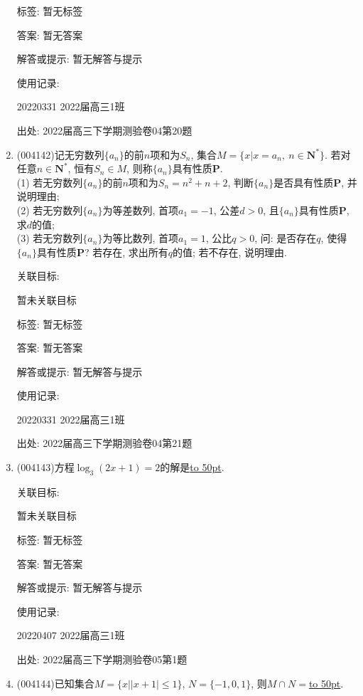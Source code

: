 \documentclass[10pt,a4paper]{article}
\newcommand{\blank}[1]{\underline{\hbox to #1pt{}}}
\begin{document}
\begin{enumerate}[1.]
标签: 暂无标签

答案: 暂无答案

解答或提示: 暂无解答与提示

使用记录:

20220331	2022届高三1班			


出处: 2022届高三下学期测验卷04第20题
\item { (004142)}记无穷数列$\{a_n\}$的前$n$项和为$S_n$, 集合$M=\{x|x=a_n, \ n\in \mathbf{N}^*\}$. 若对任意$n\in \mathbf{N}^*$, 恒有$S_n\in M$, 则称$\{a_n\}$具有性质$\mathbf{P}$.\\
(1) 若无穷数列$\{a_n\}$的前$n$项和为$S_n=n^2+n+2$, 判断$\{a_n\}$是否具有性质$\mathbf{P}$, 并说明理由;\\
(2) 若无穷数列$\{a_n\}$为等差数列, 首项$a_1=-1$, 公差$d>0$, 且$\{a_n\}$具有性质$\mathbf{P}$, 求$d$的值;\\
(3) 若无穷数列$\{a_n\}$为等比数列, 首项$a_1=1$, 公比$q>0$, 问: 是否存在$q$, 使得$\{a_n\}$具有性质$\mathbf{P}$? 若存在, 求出所有$q$的值; 若不存在, 说明理由.


关联目标:

暂未关联目标



标签: 暂无标签

答案: 暂无答案

解答或提示: 暂无解答与提示

使用记录:

20220331	2022届高三1班			


出处: 2022届高三下学期测验卷04第21题
\item { (004143)}方程$\log_3(2x+1)=2$的解是\blank{50}.


关联目标:

暂未关联目标



标签: 暂无标签

答案: 暂无答案

解答或提示: 暂无解答与提示

使用记录:

20220407	2022届高三1班	


出处: 2022届高三下学期测验卷05第1题
\item { (004144)}已知集合$M=\{x||x+1|\le 1\}$, $N=\{-1,0,1\}$, 则$M\cap N=$\blank{50}.



\end{enumerate}
\end{document}

